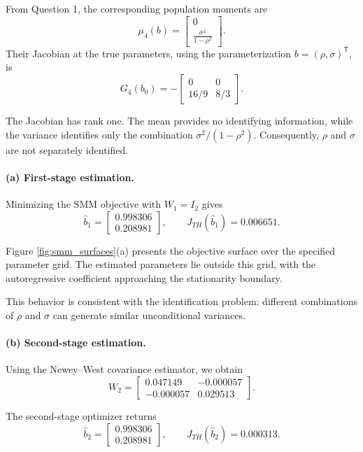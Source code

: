 \documentclass{article}
\begin{document}
From Question 1, the corresponding population moments are
\[
    \mu_4(b)
    =
    \begin{bmatrix}
        0\\[4pt]
        \displaystyle\frac{\sigma^2}{1-\rho^2}
    \end{bmatrix}.
\]
Their Jacobian at the true parameters, using the
parameterization $b=(\rho,\sigma)^{\mathsf T}$, is
\[
    G_4(b_0)
    =
    -
    \begin{bmatrix}
        0 & 0\\
        16/9 & 8/3
    \end{bmatrix}.
\]

The Jacobian has rank one. The mean provides no identifying
information, while the variance identifies only the
combination $\sigma^2/(1-\rho^2)$. Consequently,
$\rho$ and $\sigma$ are not separately identified.

\paragraph{(a) First-stage estimation.}

Minimizing the SMM objective with $W_1=I_2$ gives
\[
    \widehat b_1
    =
    \begin{bmatrix}
        0.998306\\
        0.208981
    \end{bmatrix},
    \qquad
    J_{TH}(\widehat b_1)=0.006651.
\]

Figure \ref{fig:smm_surfaces}(a) presents the objective
surface over the specified parameter grid. The estimated
parameters lie outside this grid, with the autoregressive
coefficient approaching the stationarity boundary.

This behavior is consistent with the identification problem:
different combinations of $\rho$ and $\sigma$ can generate
similar unconditional variances.

\paragraph{(b) Second-stage estimation.}

Using the Newey--West covariance estimator, we obtain
\[
    W_2
    =
    \begin{bmatrix}
        0.047149 & -0.000057\\
        -0.000057 & 0.029513
    \end{bmatrix}.
\]

The second-stage optimizer returns
\[
    \widehat b_2
    =
    \begin{bmatrix}
        0.998306\\
        0.208981
    \end{bmatrix},
    \qquad
    J_{TH}(\widehat b_2)=0.000313.
\]
\end{document}
